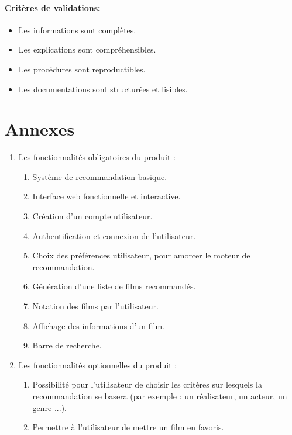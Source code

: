 \documentclass[a4paper,12pt]{report}
\begin{document}
\subsubsection*{Critères de validations:}
\begin{itemize}
    \item Les informations sont complètes.
    \item Les explications sont compréhensibles.
    \item Les procédures sont reproductibles.
    \item Les documentations sont structurées et lisibles.
\end{itemize}

\chapter*{Annexes}
\label{Fonc1}
\begin{enumerate}[label=A.\arabic*, leftmargin=1.7cm]
    \item Les fonctionnalités obligatoires du produit :
    \begin{enumerate}[label=FR-0\arabic*, leftmargin=0.8cm]
    \item Système de recommandation basique.
    \item Interface web fonctionnelle et interactive.
    \item Création d'un compte utilisateur.
    \item Authentification et connexion de l'utilisateur.
    \item Choix des préférences utilisateur, pour amorcer le moteur de recommandation.
    \item Génération d'une liste de films recommandés. 
    \item Notation des films par l'utilisateur.
    \item Affichage des informations d'un film.
    \item Barre de recherche.
\end{enumerate}
\item Les fonctionnalités optionnelles du produit :
   \begin{enumerate}[label=OFR-0\arabic*, leftmargin=1.13cm,start=2]
    \item Possibilité pour l’utilisateur de choisir les critères sur lesquels la recommandation se basera (par exemple : un réalisateur, un acteur, un genre ...).
    \item Permettre à l’utilisateur de mettre un film en favoris.
\end{enumerate}
\end{enumerate} 
\end{document}
